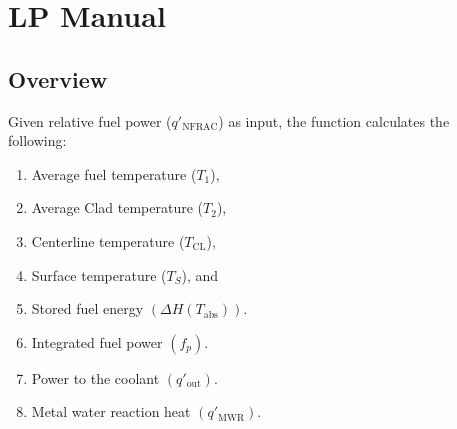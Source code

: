 \documentclass[letterpaper,12pt,baseclass=report]{cweb-hy}
\newcommand{\tclad}{T_\text{CL}}
\begin{document}


\chapter{LP Manual}

\section{Overview}


Given relative fuel power ($q'_{\mathrm{NFRAC}}$) as input, the
function {}
calculates the following:
\begin{enumerate}
\item Average fuel temperature ($T_1$),
\item Average Clad temperature ($T_2$),
\item Centerline temperature ($\tclad$),
\item Surface temperature ($T_S$), and
\item Stored fuel energy $(\Delta H(T_{\text{abs}}))$.
\item Integrated fuel power $(f_p)$.
\item Power to the coolant $(q'_{\text{out}})$.
\item Metal water reaction heat $(q'_{\text{MWR}})$.
\end{enumerate}
\end{document}

